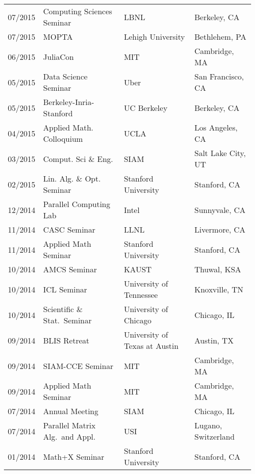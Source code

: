 \documentclass[letterpaper]{article}
\begin{document}
\begin{tabular}{rlll}
07/2015 & Computing Sciences Seminar      & LBNL                          & Berkeley, CA \\
07/2015 & MOPTA                           & Lehigh University             & Bethlehem, PA \\
06/2015 & JuliaCon                        & MIT                           & Cambridge, MA \\
05/2015 & Data Science Seminar            & Uber                          & San Francisco, CA \\
05/2015 & Berkeley-Inria-Stanford         & UC Berkeley                   & Berkeley, CA \\ 
04/2015 & Applied Math. Colloquium        & UCLA                          & Los Angeles, CA \\
03/2015 & Comput. Sci \& Eng.             & SIAM                          & Salt Lake City, UT \\
02/2015 & Lin. Alg. \& Opt. Seminar       & Stanford University           & Stanford, CA \\
12/2014 & Parallel Computing Lab          & Intel                         & Sunnyvale, CA \\
11/2014 & CASC Seminar                    & LLNL                          & Livermore, CA \\
11/2014 & Applied Math Seminar            & Stanford University           & Stanford, CA \\
10/2014 & AMCS Seminar                    & KAUST                         & Thuwal, KSA \\
10/2014 & ICL Seminar                     & University of Tennessee       & Knoxville, TN \\
10/2014 & Scientific \& Stat.\ Seminar    & University of Chicago         & Chicago, IL \\
09/2014 & BLIS Retreat                    & University of Texas at Austin & Austin, TX \\
09/2014 & SIAM-CCE Seminar                & MIT                           & Cambridge, MA \\
09/2014 & Applied Math Seminar            & MIT                           & Cambridge, MA \\
07/2014 & Annual Meeting                  & SIAM                          & Chicago, IL \\
07/2014 & Parallel Matrix Alg.\ and Appl. & USI                           & Lugano, Switzerland \\
01/2014 & Math+X Seminar                  & Stanford University           & Stanford, CA \\

\end{tabular}
\end{document}
